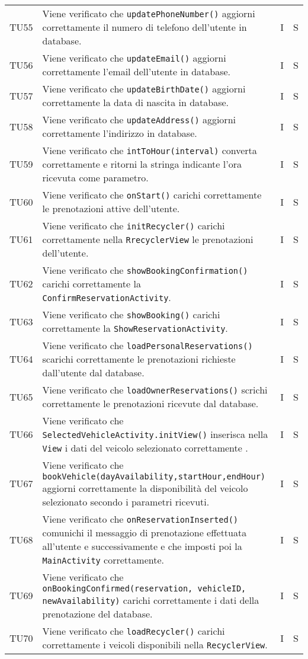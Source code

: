 \begin{longtable}{ >{\centering}p{}  >{\centering}p{} >{\centering}p{}
			>{\centering}p{}}
		\tabularnewline	
		TU55 & Viene verificato che \texttt{updatePhoneNumber()} aggiorni correttamente il numero di telefono dell'utente in database. & I & S
		\tabularnewline	
		TU56 & Viene verificato che \texttt{updateEmail()} aggiorni correttamente l'email dell'utente in database. & I & S
		\tabularnewline	
		TU57 & Viene verificato che \texttt{updateBirthDate()} aggiorni correttamente la data di nascita in database. & I & S
		\tabularnewline	
		TU58 & Viene verificato che \texttt{updateAddress()} aggiorni correttamente l'indirizzo in database. & I & S
		\tabularnewline	
		TU59 & Viene verificato che \texttt{intToHour(interval)} converta correttamente e ritorni la stringa indicante l'ora ricevuta come parametro. & I & S
		\tabularnewline	
		TU60 & Viene verificato che \texttt{onStart()} carichi correttamente le prenotazioni attive dell'utente. & I & S
		\tabularnewline	
		TU61 & Viene verificato che \texttt{initRecycler()} carichi correttamente nella \texttt{RrecyclerView} le prenotazioni dell'utente. & I & S
		\tabularnewline	
		TU62 & Viene verificato che \texttt{showBookingConfirmation()} carichi correttamente la \texttt{ConfirmReservationActivity}. & I & S
		\tabularnewline	
		TU63 & Viene verificato che \texttt{showBooking()} carichi correttamente la \texttt{ShowReservationActivity}. & I & S
		\tabularnewline	
		TU64 & Viene verificato che \texttt{loadPersonalReservations()} scarichi correttamente le prenotazioni richieste dall'utente dal database. & I & S
		\tabularnewline	
		TU65 & Viene verificato che \texttt{loadOwnerReservations()} scrichi correttamente le prenotazioni ricevute dal database. & I & S
		\tabularnewline	
		TU66 & Viene verificato che \texttt{SelectedVehicleActivity.initView()} inserisca nella \texttt{View} i dati del veicolo selezionato correttamente . & I & S
		\tabularnewline	
		TU67 & Viene verificato che \texttt{bookVehicle(dayAvailability,startHour,endHour)} aggiorni correttamente la disponibilità del veicolo selezionato secondo i parametri ricevuti. & I & S
		\tabularnewline	
		TU68 & Viene verificato che \texttt{onReservationInserted()} comunichi il messaggio di prenotazione effettuata all'utente e successivamente e che imposti poi la \texttt{MainActivity} correttamente. & I & S
		\tabularnewline	
		TU69 & Viene verificato che \texttt{onBookingConfirmed(reservation, vehicleID, newAvailability)} carichi correttamente i dati della prenotazione del database. & I & S
		\tabularnewline	
		TU70 & Viene verificato che \texttt{loadRecycler()} carichi correttamente i veicoli disponibili nella \texttt{RecyclerView}. & I & S \tabularnewline	
		

\end{longtable}
